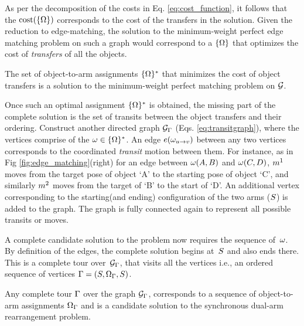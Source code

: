 As per the decomposition of the costs in Eq. \ref{eq:cost_function}, it follows that the $ \textup{cost}(\{{{\Omega}}\}) $ corresponds to the cost of the transfers in the solution. Given the reduction to edge-matching, the solution to the minimum-weight perfect edge matching problem on such a graph would correspond to a $ \{{{\Omega}}\} $ that optimizes the cost of \textit{transfers} of all the objects.

{
The set of object-to-arm assignments $ \{{{\Omega}}\}^* $ that minimizes the cost of object transfers is a solution to the minimum-weight perfect matching problem on $ \mathcal{G} $.
}

Once such an optimal assignment $ \{{{\Omega}}\}^* $ is obtained, the missing part of the complete solution is the set of transits between the object transfers and their ordering. Construct another directed graph $ \mathcal{G}_{{\Gamma}} $ (Eqs. \ref{eq:transitgraph}), where the vertices comprise of the $ {\omega} \in \{{{\Omega}}\}^*$. An edge $ e({\omega}_{u\rightarrow v}) $ between any two vertices corresponds to the coordinated \textit{transit} motion between them. For instance, as in Fig \ref{fig:edge_matching}(right) for an edge between $ {\omega}(A,B) $ and $ {\omega}(C,D) $, $ m^1 $ moves from the target pose of object `A' to the starting pose of object `C', and similarly $ m^2 $ moves from the target of `B' to the start of `D'. An additional vertex corresponding to the starting(and ending) configuration of the two arms ($ S $) is added to the graph. The graph is fully connected again to represent all possible transits or moves.  


A complete candidate solution to the problem now requires the sequence of~$ {\omega} $. By definition of the edges, the complete solution begins at~$ S $ and also ends there. This is a complete tour over~$ \mathcal{G}_{{\Gamma}} $, that visits all the vertices i.e., an ordered sequence of vertices ${\Gamma} = ( {S}, {{\Omega}}_{\Gamma}, {S}  )$.

{
\lemma [Tour]
Any complete tour $ {\Gamma} $ over the graph $ \mathcal{G}_{{\Gamma}} $, corresponds to a sequence of object-to-arm assignments $ {{\Omega}}_{\Gamma} $ and is a candidate solution to the synchronous dual-arm rearrangement problem.
}



